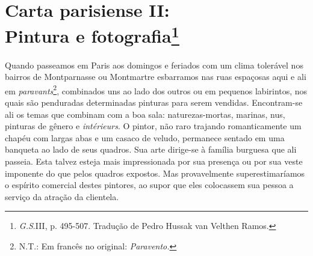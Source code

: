 \chapter{Carta parisiense II:\\
Pintura e fotografia\footnote[*]{
  \emph{G.S}.III, p. 495-507. Tradução de Pedro Hussak van Velthen
  Ramos.}}

Quando passeamos em Paris aos domingos e feriados com um clima tolerável
nos bairros de Montparnasse ou Montmartre esbarramos nas ruas espaçosas
aqui e ali em \emph{paravants}\footnote{N.T.: Em francês no original:
  \emph{Paravento.}}, combinados uns ao lado dos outros ou em pequenos
labirintos, nos quais são penduradas determinadas pinturas para serem
vendidas. Encontram-se ali os temas que combinam com a boa sala:
naturezas-mortas, marinas, nus, pinturas de gênero e \emph{intérieurs}.
O pintor, não raro trajando romanticamente um chapéu com largas abas e
um casaco de veludo, permanece sentado em uma banqueta ao lado de seus
quadros. Sua arte dirige-se à família burguesa que ali passeia. Esta
talvez esteja mais impressionada por sua presença ou por sua veste
imponente do que pelos quadros expostos. Mas provavelmente
superestimaríamos o espírito comercial destes pintores, ao supor que
eles colocassem sua pessoa a serviço da atração da clientela.

